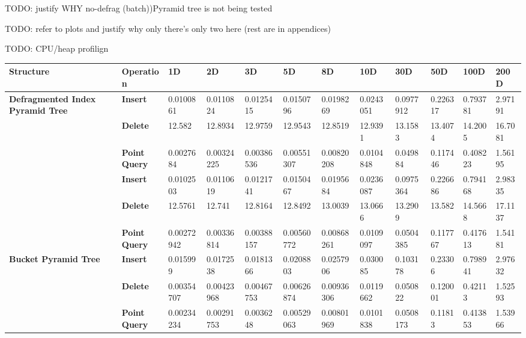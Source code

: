 TODO: justify WHY no-defrag (batch))Pyramid tree is not being tested

TODO: refer to plots and justify why only there's only two here (rest are in appendices)

TODO: CPU/heap profilign

\begin{landscape}

	\begin{table}
		\centering
		\begin{tabular}{|p{2cm}|l|l|l|l|l|l|l|l|l|l|l|}
			\hline
			\textbf{Structure} & \textbf{Operation} & \textbf{1D} & \textbf{2D} & \textbf{3D} & \textbf{5D} & \textbf{8D} & \textbf{10D} & \textbf{30D} & \textbf{50D} & \textbf{100D} & \textbf{200D} \\
			\hline
			\multirow{ 4}{*}{\textbf{Defragmented Index Pyramid Tree}} & \textbf{Insert} & 0.0100861 & 0.0110824 & 0.0125415 & 0.0150796 & 0.0198269 & 0.0243051 & 0.0977912 & 0.226317 & 0.793781 & 2.97191 \\
			 & \textbf{Delete} & 12.582 & 12.8934 & 12.9759 & 12.9543 & 12.8519 & 12.9391 & 13.1583 & 13.4074 & 14.2005 & 16.7081 \\
			 & \textbf{Point Query} & 0.0027684 & 0.00324225 & 0.00386536 & 0.00551307 & 0.00820208 & 0.0104848 & 0.049884 & 0.117446 & 0.408223 & 1.56195 \\
			\hline
			\multirow{ 4}{*}{\textbf{Rebuild Index Pyramid Tree}} & \textbf{Insert} & 0.0102503 & 0.0110619 & 0.0121741 & 0.0150467 & 0.0195684 & 0.0236087 & 0.0975364 & 0.226686 & 0.794168 & 2.98335 \\
			 & \textbf{Delete} & 12.5761 & 12.741 & 12.8164 & 12.8492 & 13.0039 & 13.0666 & 13.2909 & 13.582 & 14.5668 & 17.1137 \\
			 & \textbf{Point Query} & 0.00272942 & 0.00336814 & 0.00388157 & 0.00560772 & 0.00868261 & 0.0109097 & 0.0504385 & 0.117767 & 0.417613 & 1.54181 \\
			\hline
			\multirow{ 4}{*}{\textbf{Bucket Pyramid Tree}} & \textbf{Insert} & 0.015999 & 0.0172538 & 0.0181366 & 0.0208803 & 0.0257906 & 0.030085 & 0.103178 & 0.23306 & 0.798941 & 2.97632 \\
			 & \textbf{Delete} & 0.00354707 & 0.00423968 & 0.00467753 & 0.00626874 & 0.00936306 & 0.0119662 & 0.050822 & 0.120001 & 0.42113 & 1.52593 \\
			 & \textbf{Point Query} & 0.00234234 & 0.00291753 & 0.0036248 & 0.00529063 & 0.00801969 & 0.0101838 & 0.0508173 & 0.11813 & 0.413853 & 1.53966 \\

\end{tabular}
\end{table}
\end{landscape}
